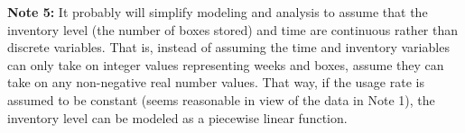 \documentclass
[justified,nohyper]
{tufte-handout}
\begin{document}
\textbf{Note 5:} It probably will simplify modeling and analysis to assume that the inventory level (the number of boxes stored) and time are continuous rather than discrete variables. That is, instead of assuming the time and inventory variables can only take on integer values representing weeks and boxes, assume they can take on any non-negative real number values. That way, if the usage rate is assumed to be constant (seems reasonable in view of the data in Note 1), the inventory level can be modeled as a piecewise linear function.
\end{document}
